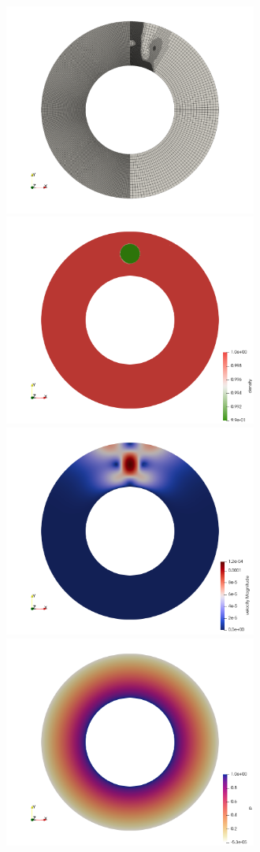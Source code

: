 \begin{center}
\includegraphics[width=8.3cm]{python_codes/fieldstone_152/results/exp2/aspect/meshes}
\includegraphics[width=8.3cm]{python_codes/fieldstone_152/results/exp2/aspect/rho}\\
\includegraphics[width=8.3cm]{python_codes/fieldstone_152/results/exp2/aspect/vel}
\includegraphics[width=8.3cm]{python_codes/fieldstone_152/results/exp2/aspect/press}
\end{center}

